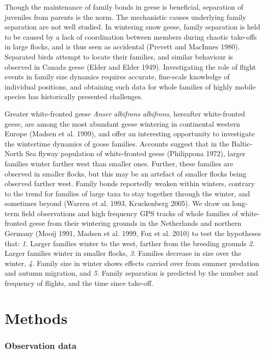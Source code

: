 \documentclass[10pt,twocolumn]{paper}
\begin{document}
Though the maintenance of family bonds in geese is beneficial,
separation of juveniles from parents is the norm. The mechanistic causes
underlying family separation are not well studied. In wintering snow
geese, family separation is held to be caused by a lack of coordination
between members during chaotic take-offs in large flocks, and is thus
seen as accidental (Prevett and MacInnes 1980). Separated birds attempt
to locate their families, and similar behaviour is observed in Canada
geese (Elder and Elder 1949). Investigating the role of flight events in
family size dynamics requires accurate, fine-scale knowledge of
individual positions, and obtaining such data for whole families of
highly mobile species has historically presented challenges.

Greater white-fronted geese \emph{Anser albifrons albifrons}, hereafter
white-fronted geese, are among the most abundant geese wintering in
continental western Europe (Madsen et al. 1999), and offer an
interesting opportunity to investigate the wintertime dynamics of goose
families. Accounts suggest that in the Baltic-North Sea flyway
population of white-fronted geese (Philippona 1972), larger families
winter farther west than smaller ones. Further, these families are
observed in smaller flocks, but this may be an artefact of smaller
flocks being observed farther west. Family bonds reportedly weaken
within winters, contrary to the trend for families of large taxa to stay
together through the winter, and sometimes beyond (Warren et al. 1993,
Kruckenberg 2005). We draw on long-term field observations and high
frequency GPS tracks of whole families of white-fronted geese from their
wintering grounds in the Netherlands and northern Germany (Mooij 1991,
Madsen et al. 1999, Fox et al. 2010) to test the hypotheses that:
\emph{1.} Larger families winter to the west, farther from the breeding
grounds \emph{2.} Larger families winter in smaller flocks, \emph{3.}
Families decrease in size over the winter, \emph{4.} Family size in
winter shows effects carried over from summer predation and autumn
migration, and \emph{5.} Family separation is predicted by the number
and frequency of flights, and the time since take-off.

\section{Methods}\label{methods}

\subsubsection{Observation data}\label{observation-data}
\end{document}
